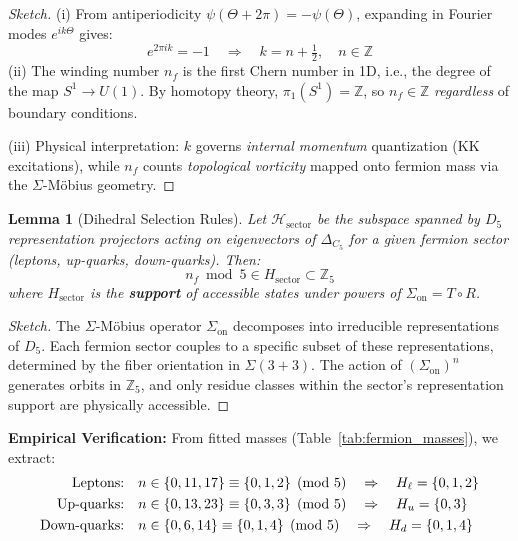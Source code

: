 \documentclass[12pt]{article}
\theoremstyle{definition}
\theoremstyle{plain}
\newtheorem{lemma}{Lemma}
\begin{document}
\begin{proof}[Sketch]
(i) From antiperiodicity $\psi(\Theta + 2\pi) = -\psi(\Theta)$, expanding in Fourier modes $e^{ik\Theta}$ gives:
\[
e^{2\pi i k} = -1 \quad \Rightarrow \quad k = n + \tfrac{1}{2}, \quad n \in \mathbb{Z}
\]
(ii) The winding number $n_f$ is the first Chern number in 1D, i.e., the degree of the map $S^1 \to U(1)$. By homotopy theory, $\pi_1(S^1) = \mathbb{Z}$, so $n_f \in \mathbb{Z}$ \emph{regardless} of boundary conditions.

(iii) Physical interpretation: $k$ governs \emph{internal momentum} quantization (KK excitations), while $n_f$ counts \emph{topological vorticity} mapped onto fermion mass via the $\Sigma$-M\"obius geometry.
\end{proof}

\begin{lemma}[Dihedral Selection Rules]
\label{lem:dihedral_selection}
Let $\mathcal{H}_{\text{sector}}$ be the subspace spanned by $D_5$ representation projectors acting on eigenvectors of $\Delta_{C_5}$ for a given fermion sector (leptons, up-quarks, down-quarks). Then:
\begin{equation}
\boxed{n_f \bmod 5 \in H_{\text{sector}} \subset \mathbb{Z}_5}
\end{equation}
where $H_{\text{sector}}$ is the \textbf{support} of accessible states under powers of $\Sigma_{\text{on}} = T \circ R$.
\end{lemma}

\begin{proof}[Sketch]
The $\Sigma$-M\"obius operator $\Sigma_{\text{on}}$ decomposes into irreducible representations of $D_5$. Each fermion sector couples to a specific subset of these representations, determined by the fiber orientation in $\Sigma(3+3)$. The action of $(\Sigma_{\text{on}})^n$ generates orbits in $\mathbb{Z}_5$, and only residue classes within the sector's representation support are physically accessible.
\end{proof}

\textbf{Empirical Verification:} From fitted masses (Table~\ref{tab:fermion_masses}), we extract:
\begin{align}
\text{Leptons:} \quad &n \in \{0, 11, 17\} \equiv \{0, 1, 2\} \pmod{5} \quad \Rightarrow \quad H_\ell = \{0, 1, 2\} \notag \\
\text{Up-quarks:} \quad &n \in \{0, 13, 23\} \equiv \{0, 3, 3\} \pmod{5} \quad \Rightarrow \quad H_u = \{0, 3\} \notag \\
\text{Down-quarks:} \quad &n \in \{0, 6, 14\} \equiv \{0, 1, 4\} \pmod{5} \quad \Rightarrow \quad H_d = \{0, 1, 4\} \notag
\end{align}
\end{document}

